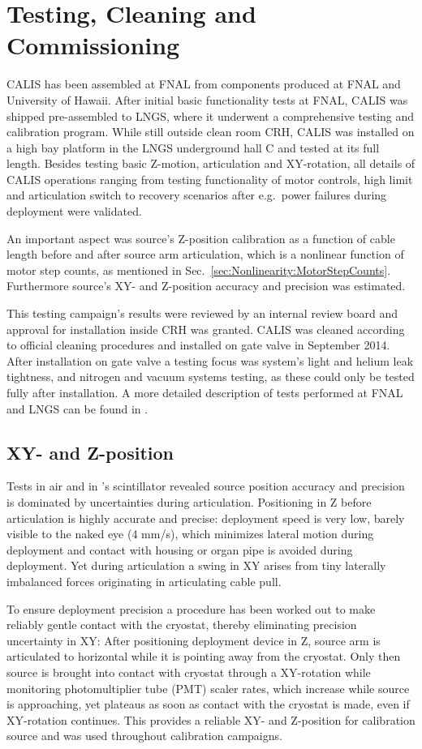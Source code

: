 \section{Testing, Cleaning and Commissioning} \label{sec:Testing}\label{sec:Commissioning}
CALIS has been assembled at FNAL from components produced at FNAL and University of Hawaii. After initial basic functionality tests at FNAL, CALIS was shipped pre-assembled to LNGS, where it underwent a comprehensive testing and calibration program. While still outside clean room CRH, CALIS was installed on a high bay platform in the LNGS underground hall C and tested at its full length. Besides testing basic Z-motion, articulation and XY-rotation, all details of CALIS operations ranging from testing functionality of motor controls, high limit and articulation switch to recovery scenarios after e.g.~power failures during deployment were validated.

An important aspect was source's Z-position calibration as a function of cable length before and after source arm articulation, which is a nonlinear function of motor step counts, as mentioned in Sec.~\ref{sec:Nonlinearity:MotorStepCounts}. Furthermore source's XY- and Z-position accuracy and precision was estimated.

This testing campaign's results were reviewed by an internal review board and approval for installation inside CRH was granted. CALIS was cleaned according to official cleaning procedures and installed on gate valve in September 2014.
After installation on gate valve a testing focus was system's light and helium leak tightness, and nitrogen and vacuum systems testing, as these could only be tested fully after installation. A more detailed description of tests performed at FNAL and LNGS can be found in \cite{thesis:Hackett, thesis:Edkins}.

\subsection*{XY- and Z-position}
Tests in air and in \lsv's scintillator revealed source position accuracy and precision is dominated by uncertainties during articulation. Positioning in Z before articulation is highly accurate and precise: deployment speed is very low, barely visible to the naked eye (4 mm/s), which minimizes lateral motion during deployment and contact with housing or organ pipe is avoided during deployment. Yet during articulation a swing in XY arises from tiny laterally imbalanced forces originating in articulating cable pull. 

To ensure deployment precision a procedure has been worked out to make reliably gentle contact with the cryostat, thereby eliminating precision uncertainty in XY: After positioning deployment device in Z, source arm is articulated to horizontal while it is pointing away from the cryostat. Only then source is brought into contact with cryostat through a XY-rotation while monitoring photomultiplier tube (PMT) scaler rates, which increase while source is approaching, yet plateaus as soon as contact with the cryostat is made, even if XY-rotation continues. This provides a reliable XY- and Z-position for calibration source and was used throughout calibration campaigns.